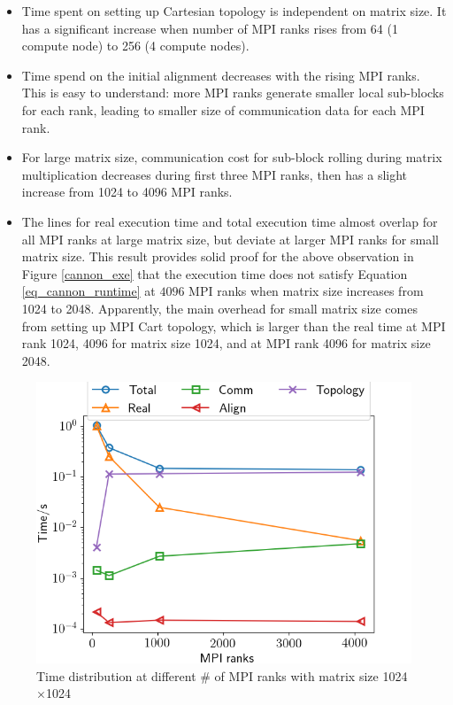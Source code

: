 \documentclass[conference]{IEEEtran}
\begin{document}
\begin{itemize}
    \item Time spent on setting up Cartesian topology is independent on matrix size. It has a significant increase when number of MPI ranks rises from 64 (1 compute node) to 256 (4 compute nodes).
    \item Time spend on the initial alignment decreases with the rising MPI ranks. This is easy to understand: more MPI ranks generate smaller local sub-blocks for each rank, leading to smaller size of communication data for each MPI rank.
    \item For large matrix size, communication cost for sub-block rolling during matrix multiplication decreases during first three MPI ranks, then has a slight increase from 1024 to 4096 MPI ranks. 
    \item The lines for real execution time and total execution time almost overlap for all MPI ranks at large matrix size, but deviate at larger MPI ranks for small matrix size. This result provides solid proof for the above observation in Figure \ref{cannon_exe} that the execution time does not satisfy Equation \ref{eq_cannon_runtime} at $4096$ MPI ranks when matrix size increases from 1024 to 2048. Apparently, the main overhead for small matrix size comes from setting up MPI Cart topology, which is larger than the real time at MPI rank 1024, 4096 for matrix size 1024, and at MPI rank 4096 for matrix size 2048.
\end{itemize}
\begin{figure}[!h]
    \centering
    \includegraphics[scale=0.4]{Figures/cannon/time_distribute_1024.png}
    \caption{ Time distribution at different \# of MPI ranks with matrix size 1024$\times$1024}
    \label{cannon_distb_1024}
\end{figure}
\end{document}
